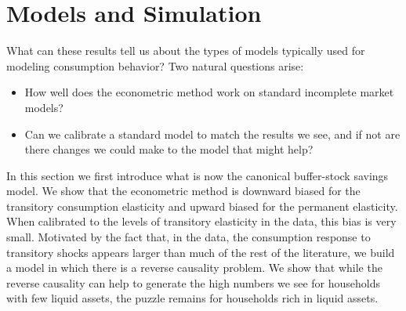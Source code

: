 \documentclass[titlepage]{\econtex}\newcommand{\texname}{IncomeUncertainty}
\begin{document}
\section{Models and Simulation}
What can these results tell us about the types of models typically used for modeling consumption behavior? Two natural questions arise:
\begin{itemize}
	\item How well does the econometric method work on standard incomplete market models?
	\item Can we calibrate a standard model to match the results we see, and if not are there changes we could make to the model that might help?
\end{itemize}
In this section we first introduce what is now the canonical buffer-stock savings model. We show that the econometric method is downward biased for the transitory consumption elasticity and upward biased for the permanent elasticity. When calibrated to the levels of transitory elasticity in the data, this bias is very small.
Motivated by the fact that, in the data, the consumption response to transitory shocks appears larger than much of the rest of the literature, we  build a model in which there is a reverse causality problem. We show that while the reverse causality can help to generate the high numbers we see for households with few liquid assets, the puzzle remains for households rich in liquid assets.
\end{document}

